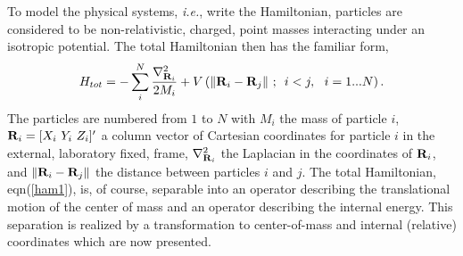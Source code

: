 To model the physical systems, {\it i.e.}, write the Hamiltonian, particles
are considered to be non-relativistic, charged, point masses interacting
under an isotropic potential. The total Hamiltonian then has the familiar
form, 
\begin{equation}
H_{tot}=-\sum_i^N\frac{\nabla _{{\bf R}_i}^2}{2M_i}+V\left( \left\| {\bf R}%
_i-{\bf R}_j\right\| \,;\,\,\,i<j,\,\,\,\,i=1...N\right) .  \label{ham1}
\end{equation}
The particles are numbered from $1$ to $N$ with $M_i$ the mass of particle $%
i $, ${\bf R}_i=[X_i\,\,Y_i\,\,Z_i]^{\prime }$ a column vector of Cartesian
coordinates for particle $i$ in the external, laboratory fixed, frame, $%
\nabla _{{\bf R}_i}^2$ the Laplacian in the coordinates of ${\bf R}_i$, and $%
\left\| {\bf R}_i-{\bf R}_j\right\| $ the distance between particles $i$ and 
$j$. The total Hamiltonian, eqn(\ref{ham1}), is, of course, separable into
an operator describing the translational motion of the center of mass and an
operator describing the internal energy. This separation is realized by a
transformation to center-of-mass and internal (relative) coordinates which
are now presented.

